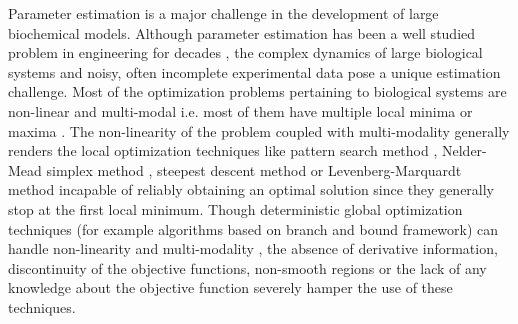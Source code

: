 \documentclass[12pt]{article}
\begin{document}
Parameter estimation is a major challenge in the development of large biochemical models.
Although parameter estimation has been a well studied problem in engineering for decades \cite{nieman1971review,beck1977parameter,young1981parameter,beck1998inverse},
the complex dynamics of large biological systems and noisy, often incomplete experimental data pose a unique estimation challenge.
Most of the optimization problems pertaining to biological systems are non-linear and multi-modal i.e. most of them have multiple local minima or maxima \cite{moles2003parameter,banga2008optimization}. The non-linearity of the problem coupled with multi-modality generally renders the local optimization techniques like pattern search method \cite{hooke1961direct}, Nelder-Mead simplex method \cite{nelder1965simplex}, steepest descent method or Levenberg-Marquardt method \cite{more1978levenberg} incapable of reliably obtaining an optimal solution since they generally stop at the first local minimum. Though deterministic global optimization techniques (for example algorithms based on branch and bound framework) can handle non-linearity and multi-modality \cite{esposito2000deterministic,horst2013global}, the absence of derivative information, discontinuity of the objective functions, non-smooth regions or the lack of any knowledge about the objective function severely hamper the use of these techniques.
\end{document}

